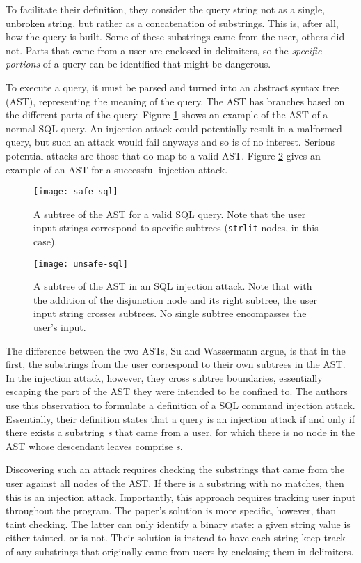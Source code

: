 \documentclass[twocolumn]{article}
\begin{document}
To facilitate their definition, they consider the query string not as a single, unbroken string, but rather as a concatenation of substrings.  This is, after all, how the query is built.  Some of these substrings came from the user, others did not.  Parts that came from a user are enclosed in delimiters, so the \emph{specific portions} of a query can be identified that might be dangerous.

To execute a query, it must be parsed and turned into an abstract syntax tree (AST), representing the meaning of the query.  The AST has branches based on the different parts of the query.  Figure \ref{fig:safe-sql-ast} shows an example of the AST of a normal SQL query.  An injection attack could potentially result in a malformed query, but such an attack would fail anyways and so is of no interest.  Serious potential attacks are those that do map to a valid AST.  Figure \ref{fig:unsafe-sql-ast} gives an example of an AST for a successful injection attack.

\begin{figure}
    \centering
    \texttt{[image: safe-sql]}
    \caption{A subtree of the AST for a valid SQL query.  Note that the user input strings correspond to specific subtrees (\texttt{strlit} nodes, in this case).}
    \label{fig:safe-sql-ast}
\end{figure}
\begin{figure}
    \texttt{[image: unsafe-sql]}
    \caption{A subtree of the AST in an SQL injection attack.  Note that with the addition of the disjunction node and its right subtree, the user input string crosses subtrees.  No single subtree encompasses the user's input.}
    \label{fig:unsafe-sql-ast}
\end{figure}

The difference between the two ASTs, Su and Wassermann argue, is that in the first, the substrings from the user correspond to their own subtrees in the AST.  In the injection attack, however, they cross subtree boundaries, essentially escaping the part of the AST they were intended to be confined to.  The authors use this observation to formulate a definition of a SQL command injection attack.  Essentially, their definition states that a query is an injection attack if and only if there exists a substring \textit{s} that came from a user, for which there is no node in the AST whose descendant leaves comprise \textit{s}.\cite{su2006}

Discovering such an attack requires checking the substrings that came from the user against all nodes of the AST.  If there is a substring with no matches, then this is an injection attack.  Importantly, this approach requires tracking user input throughout the program.  The paper's solution is more specific, however, than taint checking.  The latter can only identify a binary state: a given string value is either tainted, or is not. Their solution is instead to have each string keep track of any substrings that originally came from users by enclosing them in delimiters.
\end{document}
